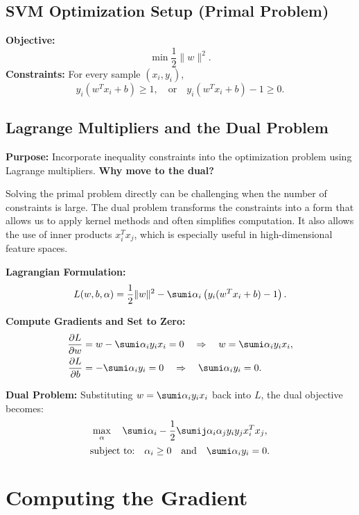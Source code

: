 \subsection{SVM Optimization Setup (Primal Problem)}
\begin{outline}
    \1 \textbf{Objective:}
    \[
    \min \frac{1}{2}\|w\|^2.
    \]
    \1 \textbf{Constraints:} For every sample \((x_i, y_i)\),
    \[
    y_i (w^T x_i + b) \geq 1, \quad \text{or} \quad y_i (w^T x_i + b) - 1 \geq 0.
    \]
\end{outline}

\subsection{Lagrange Multipliers and the Dual Problem}
\begin{outline}
    \1 \textbf{Purpose:} Incorporate inequality constraints into the optimization problem using Lagrange multipliers.
    \1 \textbf{Why move to the dual?}

    Solving the primal problem directly can be challenging when the number of constraints is large. The dual problem transforms the constraints into a form that allows us to apply kernel methods and often simplifies computation. It also allows the use of inner products \( x_i^T x_j \), which is especially useful in high-dimensional feature spaces.

    \1 \textbf{Lagrangian Formulation:}
    \[
    L(w, b, \alpha) = \frac{1}{2}\|w\|^2 - \sumi \alpha_i \left( y_i (w^T x_i + b) - 1 \right).
    \]

    \1 \textbf{Compute Gradients and Set to Zero:}
    \begin{align}
        \frac{\partial L}{\partial w} &= w - \sumi \alpha_i y_i x_i = 0 \quad \Rightarrow \quad w = \sumi \alpha_i y_i x_i, \\
        \frac{\partial L}{\partial b} &= -\sumi \alpha_i y_i = 0 \quad \Rightarrow \quad \sumi \alpha_i y_i = 0.
    \end{align}

    \1 \textbf{Dual Problem:} Substituting \( w = \sumi \alpha_i y_i x_i \) back into \( L \), the dual objective becomes:
    \[
    \max_{\alpha} \quad \sumi \alpha_i - \frac{1}{2} \sumij \alpha_i \alpha_j y_i y_j x_i^T x_j,
    \]
    \[
    \text{subject to:} \quad \alpha_i \geq 0 \quad \text{and} \quad \sumi \alpha_i y_i = 0.
    \]
\end{outline}

\section{Computing the Gradient}

